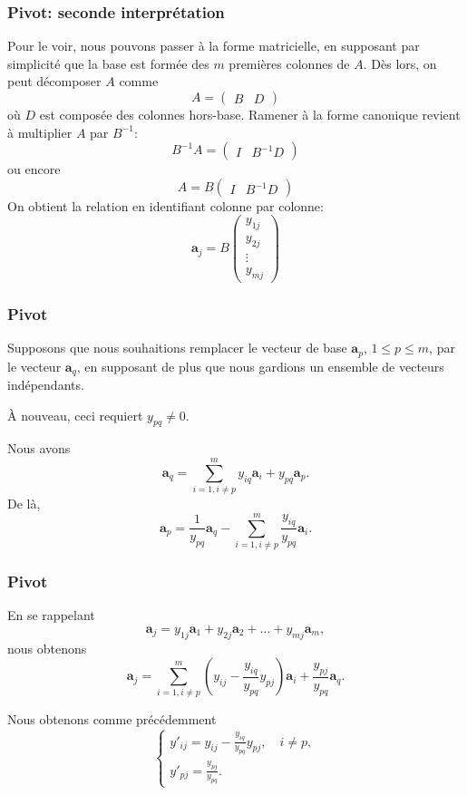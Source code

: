 \documentclass[t,usepdftitle=false]{beamer}
\def\ba{\boldsymbol{a}}
\begin{document}
\begin{frame}
\frametitle{Pivot: seconde interprétation}

Pour le voir, nous pouvons passer à la forme matricielle, en supposant par simplicité que la base est formée des $m$ premières colonnes de $A$. Dès lors, on peut décomposer $A$ comme
\[
A = \begin{pmatrix} B & D \end{pmatrix}
\]
où $D$ est composée des colonnes hors-base. Ramener à la forme canonique revient à multiplier $A$ par $B^{-1}$:
\[
B^{-1}A = \begin{pmatrix} I & B^{-1}D \end{pmatrix}
\]
ou encore
\[
A = B\begin{pmatrix} I & B^{-1}D \end{pmatrix}
\]
On obtient la relation en identifiant colonne par colonne:
\[
\ba_j = B\begin{pmatrix} y_{1j} \\ y_{2j} \\ \vdots  \\  y_{mj}\end{pmatrix}
\]

\end{frame}

\begin{frame}
\frametitle{Pivot}

Supposons que nous souhaitions remplacer le vecteur de base $\ba_p$, $1 \leq p \leq m$, par le vecteur $\ba_q$, en supposant de plus que nous gardions un ensemble de vecteurs indépendants.

\mbox{}

À nouveau, ceci requiert $y_{pq} \ne 0$.

\mbox{}

Nous avons
\[
\ba_q = \sum_{i = 1, i \ne p}^m y_{iq}\ba_i + y_{pq} \ba_p.
\]
De là,
\[
\ba_p = \frac{1}{y_{pq}}\ba_q - \sum_{i = 1, i \ne p}^m \frac{y_{iq}}{y_{pq}}\ba_i.
\]

\end{frame}

\begin{frame}
\frametitle{Pivot}

En se rappelant
\[
\ba_j = y_{1j} \ba_1 + y_{2j} \ba_2 + \ldots + y_{mj} \ba_m,
\]
nous obtenons
\[
\ba_j = \sum_{i = 1, i \ne p}^m \left( y_{ij} - \frac{y_{iq}}{y_{pq}} y_{pj} \right)\ba_i +
\frac{y_{pj}}{y_{pq}} \ba_q.
\]

\mbox{}

Nous obtenons comme précédemment
\[
\begin{cases}
y'_{ij} = y_{ij} 
 - \frac{y_{iq}}{y_{pq}} y_{pj}, \quad i \ne p, \\
 y'_{pj} = \frac{y_{pj}}{y_{pq}}.
 \end{cases}
\]

\mbox{}

\end{frame}
\end{document}
